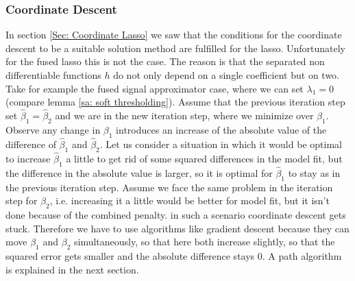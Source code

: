 \documentclass{article}
\theoremstyle{definition}
\newtheorem{lemma}[theorem]{Lemma}
\DeclareMathOperator*{\sgn}{sgn}
\begin{document}
\subsubsection{Coordinate Descent}
In section \ref{Sec: Coordinate Lasso} we saw that the conditions for the coordinate descent to be a suitable solution method are fulfilled for the lasso. Unfortunately for the fused lasso this is not the case. The reason is that the separated non differentiable functions $h$ do not only depend on a single coefficient but on two. Take for example the fused signal approximator case, where we can set $\lambda_1 = 0$ (compare lemma \ref{sa: soft thresholding}). 
Assume that the previous iteration step set $\hat{\beta}_1=\hat{\beta}_2$ and we are in the new iteration step, where we minimize over $\beta_1$. Observe any change in $\beta_1$ introduces an increase of the absolute value of the difference of $\hat{\beta}_1$ and $\hat{\beta}_2$. Let us consider a situation in which it would be optimal to increase $\hat{\beta}_1$ a little to get rid of some squared differences in the model fit, but the difference in the absolute value is larger, so it is optimal for $\hat{\beta}_1$ to stay as in the previous iteration step. Assume we face the same problem in the iteration step for $\beta_2$, i.e. increasing it a little would be better for model fit, but it isn't done because of the combined penalty.
in such a scenario coordinate descent gets stuck. Therefore we have to use algorithms like gradient descent because they can move $\beta_1$ and $\beta_2$ simultaneously, so that here both increase slightly, so that the squared error gets smaller and the absolute difference stays 0.
A path algorithm is explained in the next section.
\cite[chapter 5]{sparsity}

%
%
\end{document}
